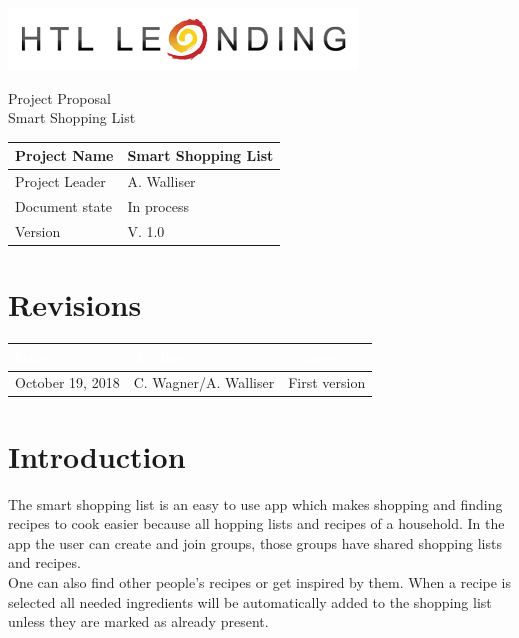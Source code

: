 \documentclass[12pt]{article}
\theoremstyle{definition}
\newenvironment{textblock}{%
   \setlength{\parindent}{0pt}
   \large
   
}{}
\newcommand{\projectname}{Smart Shopping List}
\newcommand{\productname}{Smart Shopping List}
\newcommand{\projectleader}{A. Walliser}
\newcommand{\documentstatus}{In process}
\newcommand{\version}{V. 1.0}
\begin{document}
\begin{titlepage}
\begin{flushright}
\includegraphics[scale=.5]{htlleondinglogo.png}\\
\end{flushright}

\vspace{10em}

\begin{center}
{\Huge Project Proposal} \\[3em]
{\LARGE \productname} \\[3em]
\end{center}

\begin{flushleft}
\begin{tabular}{|l|l|}
\hline
Project Name & \projectname \\ \hline
Project Leader & \projectleader \\ \hline
Document state & \documentstatus \\ \hline
Version & \version \\ \hline
\end{tabular}
\end{flushleft}

\end{titlepage}
\section*{Revisions}
\begin{tabular}{|l|l|l|}
\hline
\cellcolor[gray]{0.5}\textcolor{white}{Date} & \cellcolor[gray]{0.5}\textcolor{white}{Author} & \cellcolor[gray]{0.5}\textcolor{white}{Change} \\ \hline
October 19, 2018&C. Wagner/A. Walliser&First version \\ \hline
\end{tabular}
\pagebreak

\tableofcontents
\pagebreak

\section{Introduction}

\begin{textblock}
The smart shopping list is an easy to use app which makes shopping and finding recipes to cook easier because all hopping lists and recipes of a household. In the app the user can create and join groups, those groups have shared shopping lists and recipes. \\
One can also find other people's recipes or get inspired by them. When a recipe is selected all needed ingredients will be automatically added to the shopping list unless they are marked as already present. 
\end{textblock}
\pagebreak
\end{document}
